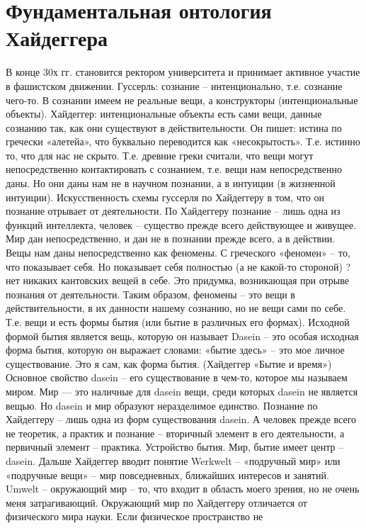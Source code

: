 \documentclass[12pt]{article}
\begin{document}
\section{Фундаментальная онтология Хайдеггера}
В конце 30х гг. становится ректором университета и принимает активное участие в фашистском движении.
Гуссерль:  сознание  –  интенционально,  т.е.  сознание  чего-то.  В  сознании  имеем  не  реальные  вещи,  а
конструкторы (интенциональные объекты).
Хайдеггер:  интенциональные  объекты  есть  сами  вещи,  данные  сознанию  так,  как  они  существуют  в
действительности.
Он пишет: истина по гречески «алетейа», что буквально переводится как «несокрытость». Т.е. истинно то, что
для нас не скрыто. Т.е. древние греки считали, что вещи могут непосредственно контактировать с сознанием,
т.е. вещи нам непосредственно даны. Но они даны нам не в научном познании, а в интуиции (в жизненной
интуиции).
Искусственность  схемы  гуссерля  по  Хайдеггеру  в  том,  что  он  познание  отрывает  от  деятельности.  По
Хайдеггеру познание – лишь одна из функций интеллекта, человек – существо прежде всего действующее и
живущее. Мир дан непосредственно, и дан не в познании прежде всего, а в действии.
Вещы  нам  даны  непосредственно  как  феномены.  С  греческого  «феномен»  –  то,  что  показывает  себя.  Но
показывает себя полностью (а не какой-то стороной) ? нет никаких кантовских вещей в себе. Это придумка,
возникающая при отрыве познания от деятельности.
Таким образом, феномены – это вещи в действительности, в их данности нашему сознанию, но не вещи сами по
себе. Т.е. вещи и есть формы бытия (или бытие в различных его формах).
Исходной формой бытия является вещь, которую он называет Dasein – это особая исходная форма бытия,
которую он выражает словами: «бытие здесь» – это мое личное существование. Это я сам, как форма бытия.
(Хайдеггер «Бытие и время»)
Основное свойство dasein – его существование в чем-то, которое мы называем миром. Мир --- это наличные для
dasein вещи, среди которых dasein не является вещью. Но dasein и мир образуют неразделимое единство.
Познание по Хайдеггеру – лишь одна из форм существования dasein. А человек прежде всего не теоретик, а
практик и познание – вторичный элемент в его деятельности, а первичный элемент – практика.
Устройство бытия.
Мир, бытие имеет центр – dasein.
Дальше Хайдеггер вводит понятие Werkwelt – «подручный мир» или «подручные вещи» – мир повседневных,
ближайших интересов и занятий. Umwelt – окружающий мир – то, что входит в область моего зрения, но не
очень меня затрагивающий.
Окружающий мир по Хайдеггеру отличается от физического мира науки. Если физическое пространство не
\end{document}
